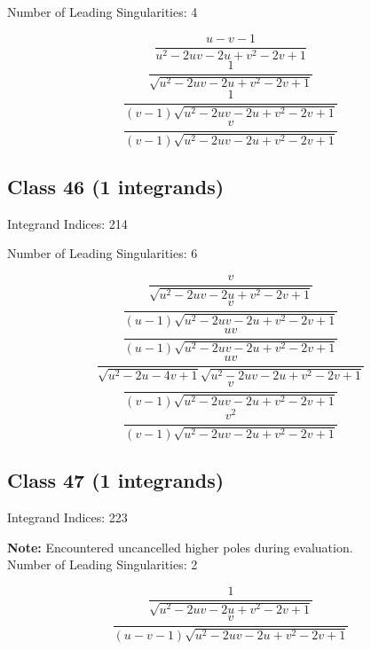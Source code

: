 \documentclass[11pt,a4paper]{article}
\begin{document}
Number of Leading Singularities: 4

\begin{equation}
\frac{u-v-1}{u^2-2 u v-2 u+v^2-2 v+1}
\end{equation}
\begin{equation}
\frac{1}{\sqrt{u^2-2 u v-2 u+v^2-2 v+1}}
\end{equation}
\begin{equation}
\frac{1}{(v-1) \sqrt{u^2-2 u v-2 u+v^2-2 v+1}}
\end{equation}
\begin{equation}
\frac{v}{(v-1) \sqrt{u^2-2 u v-2 u+v^2-2 v+1}}
\end{equation}


\subsection*{Class 46 (1 integrands)}
Integrand Indices: 214

Number of Leading Singularities: 6

\begin{equation}
\frac{v}{\sqrt{u^2-2 u v-2 u+v^2-2 v+1}}
\end{equation}
\begin{equation}
\frac{v}{(u-1) \sqrt{u^2-2 u v-2 u+v^2-2 v+1}}
\end{equation}
\begin{equation}
\frac{u v}{(u-1) \sqrt{u^2-2 u v-2 u+v^2-2 v+1}}
\end{equation}
\begin{equation}
\frac{u v}{\sqrt{u^2-2 u-4 v+1} \sqrt{u^2-2 u v-2 u+v^2-2 v+1}}
\end{equation}
\begin{equation}
\frac{v}{(v-1) \sqrt{u^2-2 u v-2 u+v^2-2 v+1}}
\end{equation}
\begin{equation}
\frac{v^2}{(v-1) \sqrt{u^2-2 u v-2 u+v^2-2 v+1}}
\end{equation}


\subsection*{Class 47 (1 integrands)}
Integrand Indices: 223

\textbf{Note:} Encountered uncancelled higher poles during evaluation.\\[1em]

Number of Leading Singularities: 2

\begin{equation}
\frac{1}{\sqrt{u^2-2 u v-2 u+v^2-2 v+1}}
\end{equation}
\begin{equation}
\frac{v}{(u-v-1) \sqrt{u^2-2 u v-2 u+v^2-2 v+1}}
\end{equation}
\end{document}
